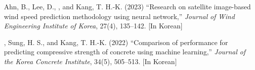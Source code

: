 \begin{pubSubsectionNum}
    \item Ahn, B., Lee, D., \me, and Kang, T. H.-K. (2023) ``Research on satellite image-based wind speed prediction methodology using neural network,'' \textit{Journal of Wind Engineering Institute of Korea}, 27(4), 135--142. [In Korean]
    \item \me, Sung, H. S., and Kang, T. H.-K. (2022) ``Comparison of performance for predicting compressive strength of concrete using machine learning,'' \textit{Journal of the Korea Concrete Institute}, 34(5), 505--513. [In Korean]
\end{pubSubsectionNum}
